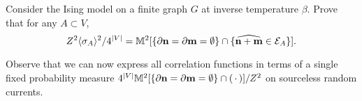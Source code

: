 \begin{exercise}
    Consider the Ising model on a finite graph $G$
    at inverse temperature $\beta$.
    Prove that for any $A\subset V$,
    \[
        Z^2\langle\sigma_A\rangle^2/4^{|V|}
        =
        \mathbb M^2[\{\partial\mathbf{n}=\partial\mathbf{m}=\emptyset\}\cap\{\widehat{\mathbf{n}+\mathbf{m}}\in\mathcal E_A\}].
    \]

    Observe that we can now express all correlation functions in terms of a single
    fixed probability measure $4^{|V|}\mathbb M^2[\{\partial\mathbf{n}=\partial\mathbf{m}=\emptyset\}\cap(\,\cdot\,)]/Z^2$ on sourceless random currents.
\end{exercise}
